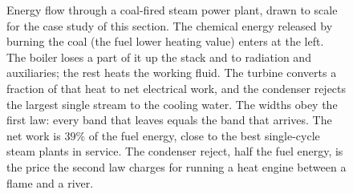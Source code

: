 \begin{figure}[htbp]
\caption[Energy flow through a coal-fired steam power plant]{Energy flow
through a coal-fired steam power plant, drawn to scale for the case study of
this section. The chemical energy released by burning the coal (the fuel
lower heating value) enters at the left. The boiler loses a part of it up
the stack and to radiation and auxiliaries; the rest heats the working
fluid. The turbine converts a fraction of that heat to net electrical work,
and the condenser rejects the largest single stream to the cooling water.
The widths obey the first law: every band that leaves equals the band that
arrives. The net work is $39\%$ of the fuel energy, close to the best
single-cycle steam plants in service. The condenser reject, half the fuel
energy, is the price the second law charges for running a heat engine
between a flame and a river.}
\label{fig:vol04ch01:plant-sankey}
\end{figure}
